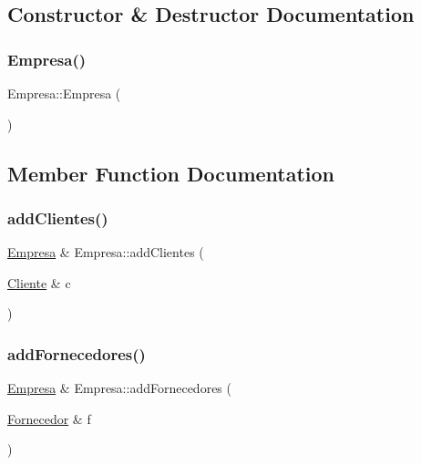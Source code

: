 \subsection{Constructor \& Destructor Documentation}
\mbox{\label{classEmpresa_aff124b958356c479ab50ddf4cf302193}} 
\subsubsection{\texorpdfstring{Empresa()}{Empresa()}}
{\footnotesize\ttfamily Empresa\+::\+Empresa (\begin{DoxyParamCaption}{ }\end{DoxyParamCaption})}



\subsection{Member Function Documentation}
\mbox{\label{classEmpresa_a57597ec4154f274686bc648ccf5d2a59}} 
\subsubsection{\texorpdfstring{add\+Clientes()}{addClientes()}}
{\footnotesize\ttfamily \hyperlink{classEmpresa}{Empresa} \& Empresa\+::add\+Clientes (\begin{DoxyParamCaption}\item[{\hyperlink{classCliente}{Cliente} \&}]{c }\end{DoxyParamCaption})}

\mbox{\label{classEmpresa_a0c858479d6e92094adbb2fc085039376}} 
\subsubsection{\texorpdfstring{add\+Fornecedores()}{addFornecedores()}}
{\footnotesize\ttfamily \hyperlink{classEmpresa}{Empresa} \& Empresa\+::add\+Fornecedores (\begin{DoxyParamCaption}\item[{\hyperlink{classFornecedor}{Fornecedor} \&}]{f }\end{DoxyParamCaption})}

